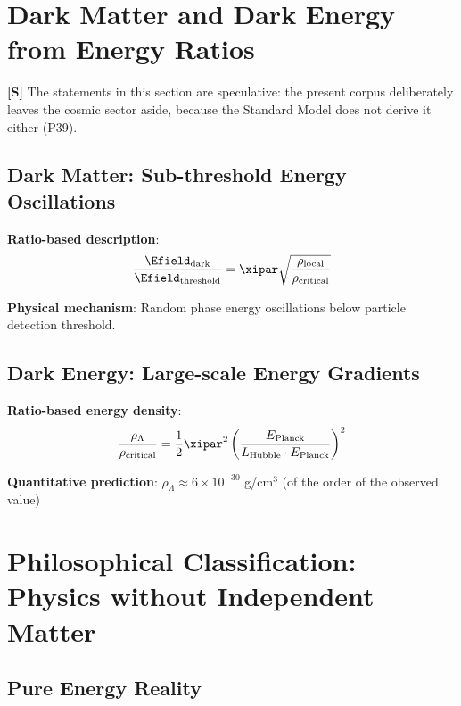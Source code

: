 	\section{Dark Matter and Dark Energy\\ from Energy Ratios}
	
	\textbf{[S]} The statements in this section are speculative: the present corpus deliberately leaves the cosmic sector aside, because the Standard Model does not derive it either (P39).
	
	\subsection{Dark Matter: Sub-threshold Energy Oscillations}
	
	\textbf{Ratio-based description}:
	\begin{equation}
		\frac{\Efield_{\text{dark}}}{\Efield_{\text{threshold}}} = \xipar \sqrt{\frac{\rho_{\text{local}}}{\rho_{\text{critical}}}}
	\end{equation}
	
	\textbf{Physical mechanism}: Random phase energy oscillations below particle detection threshold.
	
	\subsection{Dark Energy: Large-scale Energy Gradients}
	
	\textbf{Ratio-based energy density}:
	\begin{equation}
		\frac{\rho_{\Lambda}}{\rho_{\text{critical}}} = \frac{1}{2} \xipar^2 \left(\frac{E_{\text{Planck}}}{L_{\text{Hubble}} \cdot E_{\text{Planck}}}\right)^2
	\end{equation}
	
	\textbf{Quantitative prediction}: $\rho_{\Lambda} \approx 6 \times 10^{-30}$ g/cm$^3$ (of the order of the observed value)

	
	\section{Philosophical Classification: Physics without Independent Matter}
	
	\subsection{Pure Energy Reality}
	
